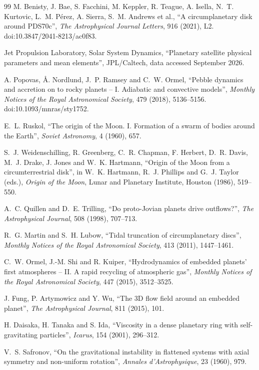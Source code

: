 \documentclass[11pt,a4paper,openany]{report}
\begin{document}
\begin{thebibliography}{99}
 M. Benisty, J. Bae, S. Facchini, M. Keppler, R. Teague, A. Isella,
N.~T. Kurtovic, L.~M. Pérez, A. Sierra, S.~M. Andrews et al., ``A circumplanetary disk around
PDS70c'', \emph{The Astrophysical Journal Letters}, 916 (2021), L2. doi:10.3847/2041-8213/ac0f83.

 Jet Propulsion Laboratory, Solar System Dynamics, ``Planetary satellite physical
parameters and mean elements'', JPL/Caltech, data accessed September 2026.

 A. Popovas, Å. Nordlund, J.~P. Ramsey and C.~W. Ormel, ``Pebble dynamics and
accretion on to rocky planets -- I. Adiabatic and convective models'', \emph{Monthly Notices of the
Royal Astronomical Society}, 479 (2018), 5136--5156. doi:10.1093/mnras/sty1752.

 E.~L. Ruskol, ``The origin of the Moon. I. Formation of a swarm of bodies
around the Earth'', \emph{Soviet Astronomy}, 4 (1960), 657.

 S.~J. Weidenschilling, R. Greenberg, C.~R. Chapman, F. Herbert,
D.~R. Davis, M.~J. Drake, J. Jones and W.~K. Hartmann, ``Origin of the Moon from a circumterrestrial
disk'', in W.~K. Hartmann, R.~J. Phillips and G.~J. Taylor (eds.), \emph{Origin of the Moon}, Lunar
and Planetary Institute, Houston (1986), 519--550.

 A.~C. Quillen and D.~E. Trilling, ``Do proto-Jovian planets drive
outflows?'', \emph{The Astrophysical Journal}, 508 (1998), 707--713.

 R.~G. Martin and S.~H. Lubow, ``Tidal truncation of circumplanetary
discs'', \emph{Monthly Notices of the Royal Astronomical Society}, 413 (2011), 1447--1461.

 C.~W. Ormel, J.-M. Shi and R. Kuiper, ``Hydrodynamics of embedded planets' first
atmospheres -- II. A rapid recycling of atmospheric gas'', \emph{Monthly Notices of the Royal
Astronomical Society}, 447 (2015), 3512--3525.

 J. Fung, P. Artymowicz and Y. Wu, ``The 3D flow field around an embedded
planet'', \emph{The Astrophysical Journal}, 811 (2015), 101.

 H. Daisaka, H. Tanaka and S. Ida, ``Viscosity in a dense planetary ring with
self-gravitating particles'', \emph{Icarus}, 154 (2001), 296--312.

 V.~S. Safronov, ``On the gravitational instability in flattened systems with
axial symmetry and non-uniform rotation'', \emph{Annales d'Astrophysique}, 23 (1960), 979.


\end{thebibliography}
\end{document}
